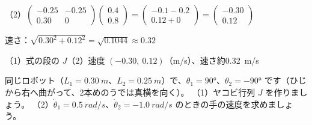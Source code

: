 \begin{reidai}[ロボットの手の速度]
\kviica （2）$\begin{pmatrix}-0.25&-0.25\\0.30&0\end{pmatrix}\begin{pmatrix}0.4\\0.8\end{pmatrix}=\begin{pmatrix}-0.1-0.2\\0.12+0\end{pmatrix}=\begin{pmatrix}-0.30\\0.12\end{pmatrix}$\par
\kviicb 速さ：$\sqrt{0.30^2+0.12^2}=\sqrt{0.1044}\approx0.32$\par
\kotae\kviics{}\zw{} （1）式の段の $J$\quad （2）速度 $(-0.30,\ 0.12)$（m/s）、速さ約\qty{0.32}{m/s}\par\vspace{2pt}

\end{reidai}

\begin{jibun}
同じロボット（$L_1=\qty{0.30}{m}$、$L_2=\qty{0.25}{m}$）で、$\theta_1=90°$、$\theta_2=-90°$ です（ひじから右へ曲がって、2本めのうでは真横を向く）。\newline
（1）ヤコビ行列 $J$ を作りましょう。\newline
（2）$\dot\theta_1=\qty{0.5}{rad/s}$、$\dot\theta_2=\qty{-1.0}{rad/s}$ のときの手の速度を求めましょう。
\end{jibun}

